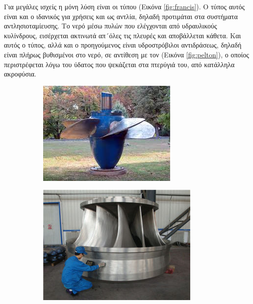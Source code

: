 \documentclass[12pt]{report}
\begin{document}
Για μεγάλες ισχείς η μόνη λύση είναι οι τύπου {} (Εικόνα \ref{fig:francis}). Ο τύπος αυτός είναι και ο ιδανικός για χρήσεις και ως αντλία, δηλαδή προτιμάται στα συστήματα αντλησιοταμίευσης. 
Το νερό μέσω πυλών που ελέγχονται από υδραυλικούς κυλίνδρους, εισέρχεται ακτινωτά απ´όλες τις πλευρές και αποβάλλεται κάθετα.
Και αυτός ο τύπος, αλλά και ο προηγούμενος είναι υδροστρόβιλοι αντιδράσεως, δηλαδή είναι πλήρως βυθισμένοι στο νερό, σε αντίθεση με τον {} (Εικόνα \ref{fig:pelton}), ο οποίος περιστρέφεται λόγω του ύδατος που 
ψεκάζεται στα πτερύγιά του, από κατάλληλα ακροφύσια.

\begin{figure}[b]
     \centering
     \begin{subfigure}[b]{0.3\textwidth}
         \centering
         \includegraphics[width=\textwidth]{kaplan}
				 \caption{{}}
         \label{fig:kaplan}
     \end{subfigure}
     \hfill
     \begin{subfigure}[b]{0.3\textwidth}
         \centering
         \includegraphics[width=\textwidth]{francis}

\end{subfigure}
\end{figure}
\end{document}
